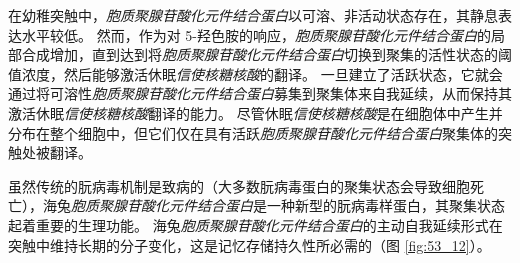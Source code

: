 在幼稚突触中，\textit{胞质聚腺苷酸化元件结合蛋白}以可溶、非活动状态存在，其静息表达水平较低。
然而，作为对 5-羟色胺的响应，\textit{胞质聚腺苷酸化元件结合蛋白}的局部合成增加，直到达到将\textit{胞质聚腺苷酸化元件结合蛋白}切换到聚集的活性状态的阈值浓度，然后能够激活休眠\textit{信使核糖核酸}的翻译。
一旦建立了活跃状态，它就会通过将可溶性\textit{胞质聚腺苷酸化元件结合蛋白}募集到聚集体来自我延续，从而保持其激活休眠\textit{信使核糖核酸}翻译的能力。
尽管休眠\textit{信使核糖核酸}是在细胞体中产生并分布在整个细胞中，但它们仅在具有活跃\textit{胞质聚腺苷酸化元件结合蛋白}聚集体的突触处被翻译。


虽然传统的朊病毒机制是致病的（大多数朊病毒蛋白的聚集状态会导致细胞死亡），海兔\textit{胞质聚腺苷酸化元件结合蛋白}是一种新型的朊病毒样蛋白，其聚集状态起着重要的生理功能。
海兔\textit{胞质聚腺苷酸化元件结合蛋白}的主动自我延续形式在突触中维持长期的分子变化，这是记忆存储持久性所必需的（图 \ref{fig:53_12}）。


